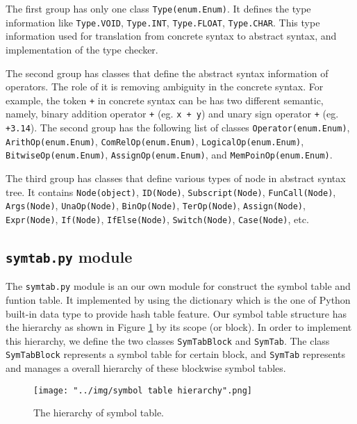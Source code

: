 \documentclass{article}
\newcommand{\code}[1]{\texttt{#1}}
\begin{document}
	The first group has only one class \code{Type(enum.Enum)}. It defines the type information like \code{Type.VOID}, \code{Type.INT}, \code{Type.FLOAT}, \code{Type.CHAR}. This type information used for translation from concrete syntax to abstract syntax, and implementation of the type checker.
	
	The second group has classes that define the abstract syntax information of operators. The role of it is removing ambiguity in the concrete syntax. For example, the token \code{+} in concrete syntax can be has two different semantic, namely, binary addition operator \code{+} (eg. \code{x + y}) and unary sign operator \code{+} (eg. \code{+3.14}). The second group has the following list of classes \code{Operator(enum.Enum)}, \code{ArithOp(enum.Enum)}, \code{ComRelOp(enum.Enum)}, \code{LogicalOp(enum.Enum)}, \code{BitwiseOp(enum.Enum)}, \code{AssignOp(enum.Enum)}, and \code{MemPoinOp(enum.Enum)}.
	
	The third group has classes that define various types of node in abstract syntax tree. It contains \code{Node(object)}, \code{ID(Node)}, \code{Subscript(Node)}, \code{FunCall(Node)}, \code{Args(Node)}, \code{UnaOp(Node)}, \code{BinOp(Node)}, \code{TerOp(Node)}, \code{Assign(Node)}, \code{Expr(Node)}, \code{If(Node)}, \code{IfElse(Node)}, \code{Switch(Node)}, \code{Case(Node)}, etc.
	
	\subsection{\code{symtab.py} module}
	
	The \code{symtab.py} module is an our own module for construct the symbol table and funtion table. It implemented by using the dictionary which is the one of Python built-in data type to provide hash table feature. Our symbol table structure has the hierarchy as shown in Figure \ref{fig: hierarchy of symbol table} by its scope (or block). In order to implement this hierarchy, we define the two classes \code{SymTabBlock} and \code{SymTab}. The class \code{SymTabBlock} represents a symbol table for certain block, and \code{SymTab} represents and manages a overall hierarchy of these blockwise symbol tables.
	
	\begin{figure}[ht]
		\centering
		\texttt{[image: "../img/symbol table hierarchy".png]}
		\caption{The hierarchy of symbol table. \cite{Aho:2006:CPT:1177220}}
		\label{fig: hierarchy of symbol table}
	\end{figure}
	
\end{document}
